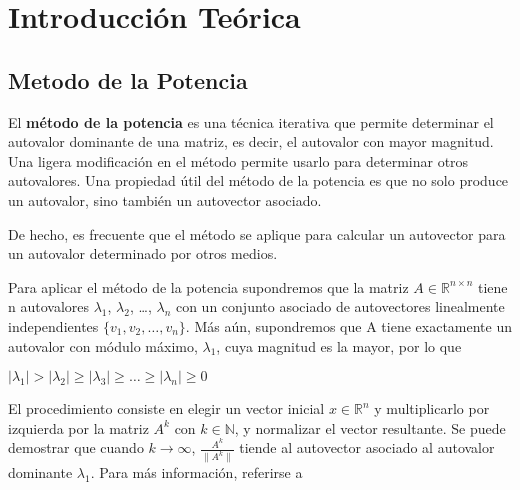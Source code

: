 \section{Introducci\'on Te\'orica}
\subsection{Metodo de la Potencia}
El \textbf{método de la potencia} es una técnica iterativa que permite determinar el autovalor dominante de una matriz, es decir, el autovalor con mayor magnitud. Una ligera modificación en el método permite usarlo para determinar otros autovalores. Una propiedad útil del método de la potencia es que no solo produce un autovalor, sino también un autovector asociado. 

De hecho, es frecuente que el método se aplique para calcular un autovector para un autovalor determinado por otros medios.

Para aplicar el método de la potencia supondremos que la matriz $A \in \mathbb{R}^{n \times n}$
tiene n autovalores $\lambda_1$, $\lambda_2$, \ldots , $\lambda_n$ con un conjunto asociado de
autovectores linealmente independientes $\{v_1,v_2, \ldots, v_n\}$. Más aún, supondremos que A tiene
exactamente un autovalor con módulo máximo, $\lambda_1$, cuya magnitud es la mayor, por lo que
\begin{center}
$|\lambda_1| > |\lambda_2| \geq |\lambda_3| \geq \ldots \geq |\lambda_n| \geq 0$
\end{center}

%
%
%
%
%
%

El procedimiento consiste en elegir un vector inicial $x \in \mathbb{R}^n$ y multiplicarlo por
izquierda por la matriz $A^k$ con $k \in \mathbb{N}$, y normalizar el vector resultante. Se puede
demostrar que cuando $k \rightarrow \infty$, $\frac{A^k}{\| A^k \| }$ tiende al autovector asociado
al autovalor  dominante $\lambda_1$. Para más información, referirse a \cite{burden}

